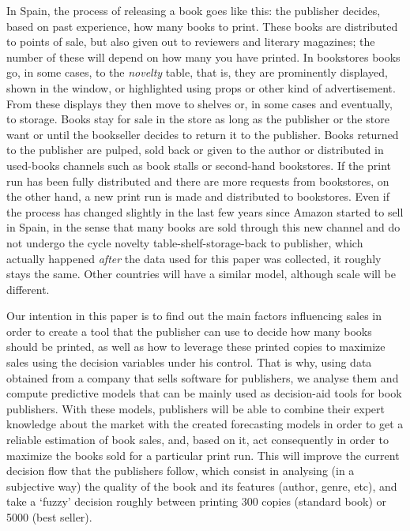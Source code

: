 \documentclass[a4paper,10pt,twocolumn,preprint,3p]{elsarticle}
\begin{document}
In Spain, the process of releasing a book goes like this: the
publisher decides, based on past experience, how many books to
print. These books are distributed to points of sale, but also given
out to reviewers and literary magazines; the number of these will
depend on how many you have printed. In bookstores books  go, in some cases, to
the {\em novelty} table, that is, they are prominently displayed, shown in the window, or highlighted using props or other 
kind of advertisement. From these displays they then move to shelves
or, in some cases and eventually, to storage. Books stay for sale in the store as long as the
publisher or the store want or until the bookseller decides to return it
to the publisher. Books returned to the publisher are pulped, sold back or
given to the author or distributed in used-books channels such as
book stalls or second-hand bookstores. If the print run has been fully
distributed and there are more requests from bookstores, on the other
hand, a new print run is made and distributed to bookstores. 
Even if the process has changed slightly 
in the last few years since Amazon started to sell in Spain, in the
sense that many books are sold through this new channel and do not
undergo the cycle novelty table-shelf-storage-back to publisher, which
actually happened {\em after} the data used for this paper was
collected, it roughly stays the same. Other countries will have a
similar model, although scale will be different. 

Our intention in this paper is to find out the main factors influencing
sales in order to create a tool that the publisher can use to decide how
many books should be printed, as well as how to leverage these printed
copies to maximize sales using the decision variables under his
control. That is why, using data obtained from a  company that sells
software for publishers, we analyse them and compute predictive models that can be mainly used as decision-aid tools for book publishers. With these models, publishers will be able to combine their expert knowledge about the market with the created forecasting models in order to get a reliable estimation of book
sales, and, based on it, act consequently in order to maximize the books sold for a particular print run. This will improve the current decision flow that the publishers follow, which consist in analysing (in a subjective way) the quality of the book and its features (author, genre, etc), and take a `fuzzy' decision roughly between printing 300 copies (standard book) or 5000 (best seller).
\end{document}
